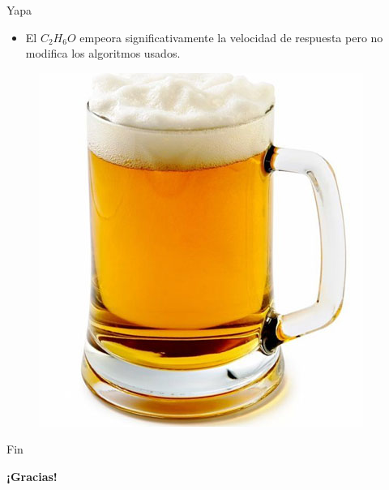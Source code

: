 \documentclass{beamer}
\begin{document}
\begin{frame}{Yapa}
\begin{itemize}
  \item El $C_{2}H_{6}O$ empeora significativamente la velocidad de respuesta pero no modifica los algoritmos usados.
\end{itemize}
\pause
\begin{figure}
	\includegraphics[width=0.6\linewidth]{birra.jpg}
\end{figure}
\end{frame}


\begin{frame}{Fin}
\begin{center}
\huge{\textbf{¡Gracias!}}
\end{center}
\end{frame}
\end{document}
